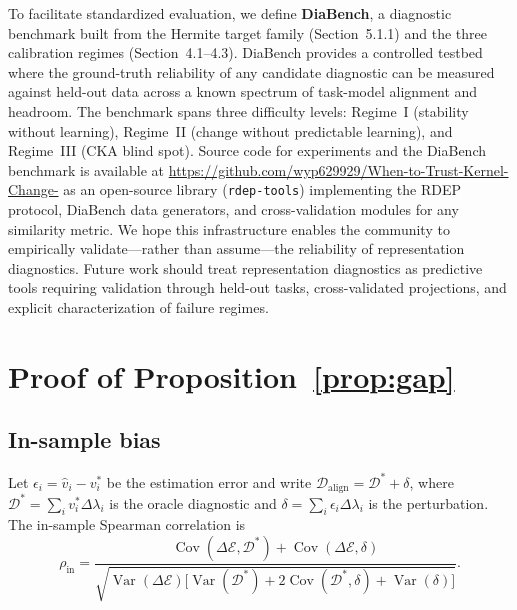 \documentclass[twoside,11pt]{article}
\begin{document}
To facilitate standardized evaluation, we define \textbf{DiaBench}, a diagnostic benchmark built from the Hermite target family (Section~5.1.1) and the three calibration regimes (Section~4.1--4.3). DiaBench provides a controlled testbed where the ground-truth reliability of any candidate diagnostic can be measured against held-out data across a known spectrum of task-model alignment and headroom. The benchmark spans three difficulty levels: Regime~I (stability without learning), Regime~II (change without predictable learning), and Regime~III (CKA blind spot). Source code for experiments and the DiaBench benchmark is available at \url{https://github.com/wyp629929/When-to-Trust-Kernel-Change-} as an open-source library (\texttt{rdep-tools}) implementing the RDEP protocol, DiaBench data generators, and cross-validation modules for any similarity metric. We hope this infrastructure enables the community to empirically validate---rather than assume---the reliability of representation diagnostics. Future work should treat representation diagnostics as predictive tools requiring validation through held-out tasks, cross-validated projections, and explicit characterization of failure regimes.





\appendix
\setcounter{figure}{0}
\setcounter{table}{0}
\renewcommand{\thefigure}{S\arabic{figure}}
\renewcommand{\thetable}{S\arabic{table}}

\section{Proof of Proposition~\ref{prop:gap}}
\label{app:proof}

\subsection{In-sample bias}

Let $\epsilon_i = \hat{v}_i - v_i^*$ be the estimation error and write $\mathcal{D}_{\text{align}} = \mathcal{D}^* + \delta$, where $\mathcal{D}^* = \sum_i v_i^* \Delta\lambda_i$ is the oracle diagnostic and $\delta = \sum_i \epsilon_i \Delta\lambda_i$ is the perturbation. The in-sample Spearman correlation is
\[
\rho_{\text{in}} = \frac{\operatorname{Cov}(\Delta\mathcal{E}, \mathcal{D}^*) + \operatorname{Cov}(\Delta\mathcal{E}, \delta)}{\sqrt{\operatorname{Var}(\Delta\mathcal{E})\bigl[\operatorname{Var}(\mathcal{D}^*) + 2\operatorname{Cov}(\mathcal{D}^*, \delta) + \operatorname{Var}(\delta)\bigr]}}.
\]
\end{document}

